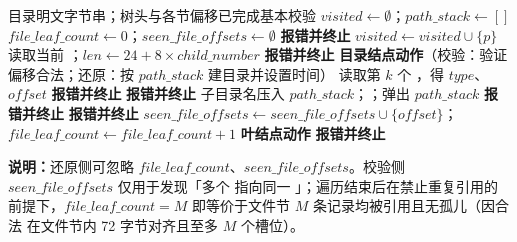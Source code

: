 \begin{algorithm}[htbp]
\caption{目录树遍历框架（供校验与还原共同引用）}
\label{alg:tree-visit}
\begin{algorithmic}[1]
\Require 目录明文字节串；树头与各节偏移已完成基本校验
\State $\mathit{visited} \gets \emptyset$；$\mathit{path\_stack} \gets []$
\State $\mathit{file\_leaf\_count} \gets 0$；$\mathit{seen\_file\_offsets} \gets \emptyset$ 
  \If{$p \notin [\mathit{dir\_offset},\ \mathit{file\_offset})$ \textbf{ or } $p \in \mathit{visited}$}
    \State \textbf{报错并终止}
  \EndIf
  \State $\mathit{visited} \gets \mathit{visited} \cup \{p\}$
  \State 读取当前 ；$\mathit{len} \gets 24 + 8 \times \mathit{child\_number}$
    \State \textbf{报错并终止}
  \EndIf
  \State \textbf{目录结点动作}（校验：验证  偏移合法；还原：按 $\mathit{path\_stack}$ 建目录并设置时间）
    \State 读取第 $k$ 个 ，得 $\mathit{type}$、$\mathit{offset}$
      \State \textbf{报错并终止} 
      \If{$\mathit{offset} \notin [\mathit{dir\_offset},\ \mathit{file\_offset})$}
        \State \textbf{报错并终止}
      \EndIf
      \State 子目录名压入 $\mathit{path\_stack}$；；弹出 $\mathit{path\_stack}$
      \If{$(\mathit{offset}-\mathit{file\_offset}) \bmod 72 \neq 0$ \textbf{ or } $\mathit{offset} \notin [\mathit{file\_offset},\ \mathit{str\_offset})$}
        \State \textbf{报错并终止}
      \EndIf
        \State \textbf{报错并终止} 
      \EndIf
      \State $\mathit{seen\_file\_offsets} \gets \mathit{seen\_file\_offsets} \cup \{\mathit{offset}\}$；$\mathit{file\_leaf\_count} \gets \mathit{file\_leaf\_count} + 1$
      \State \textbf{叶结点动作} 
    \Else
      \State \textbf{报错并终止}
    \EndIf
  \EndFor
\EndProcedure
\State {}
\end{algorithmic}
\end{algorithm}

\noindent\textbf{说明：}还原侧可忽略 $\mathit{file\_leaf\_count}$、$\mathit{seen\_file\_offsets}$。校验侧 $\mathit{seen\_file\_offsets}$ 仅用于发现「多个  指向同一 」；遍历结束后在禁止重复引用的前提下，$\mathit{file\_leaf\_count} = M$ 即等价于文件节 $M$ 条记录均被引用且无孤儿（因合法  在文件节内 72 字节对齐且至多 $M$ 个槽位）。

